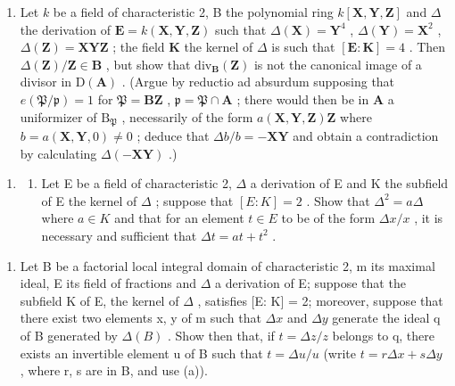 \begin{enumerate}
\item
  Let \(k\) be a field of characteristic 2, B the polynomial ring \(k[\mathbf{X}, \mathbf{Y}, \mathbf{Z}]\) and \(\Delta\) the derivation of \(\mathbf{E} = k(\mathbf{X}, \mathbf{Y}, \mathbf{Z})\) such that \(\Delta(\mathbf{X}) = \mathbf{Y}^4\) , \(\Delta(\mathbf{Y}) = \mathbf{X}^2\) , \(\Delta(\mathbf{Z}) = \mathbf{XYZ}\) ; the field \(\mathbf{K}\) the kernel of \(\Delta\) is such that \([\mathbf{E} : \mathbf{K}] = 4\) . Then \(\Delta(\mathbf{Z}) / \mathbf{Z} \in \mathbf{B}\) , but show that \(\mathrm{div}_{\mathbf{B}}(\mathbf{Z})\) is not the canonical image of a divisor in \(\mathrm{D}(\mathbf{A})\) . (Argue by reductio ad absurdum supposing that \(e(\mathfrak{P} / \mathfrak{p}) = 1\) for \(\mathfrak{P} = \mathbf{B}\mathbf{Z}\) , \(\mathfrak{p} = \mathfrak{P} \cap \mathbf{A}\) ; there would then be in \(\mathbf{A}\) a uniformizer of \(\mathrm{B}_{\mathfrak{P}}\) , necessarily of the form \(a(\mathbf{X}, \mathbf{Y}, \mathbf{Z})\mathbf{Z}\) where \(b = a(\mathbf{X}, \mathbf{Y}, 0) \neq 0\) ; deduce that \(\Delta b / b = -\mathbf{X}\mathbf{Y}\) and obtain a contradiction by calculating \(\Delta(-\mathbf{X}\mathbf{Y})\) .)
\end{enumerate}

\begin{enumerate}
\def\labelenumi{\arabic{enumi}.}
\setcounter{enumi}{23}
\tightlist
\item
  \begin{enumerate}
  \def\labelenumii{(\alph{enumii})}
  \tightlist
  \item
    Let E be a field of characteristic 2, \(\Delta\) a derivation of E and K the subfield of E the kernel of \(\Delta\) ; suppose that \([E:K]=2\) . Show that \(\Delta^{2}=a\Delta\) where \(a\in K\) and that for an element \(t\in E\) to be of the form \(\Delta x/x\) , it is necessary and sufficient that \(\Delta t=at+t^{2}\) .
  \end{enumerate}
\end{enumerate}

\begin{enumerate}
\def\labelenumi{(\alph{enumi})}
\setcounter{enumi}{1}
\tightlist
\item
  Let B be a factorial local integral domain of characteristic 2, m its maximal ideal, E its field of fractions and \(\Delta\) a derivation of E; suppose that the subfield K of E, the kernel of \(\Delta\) , satisfies {[}E: K{]} = 2; moreover, suppose that there exist two elements x, y of m such that \(\Delta x\) and \(\Delta y\) generate the ideal q of B generated by \(\Delta(B)\) . Show then that, if \(t = \Delta z / z\) belongs to q, there exists an invertible element u of B such that \(t = \Delta u / u\) (write \(t = r \Delta x + s \Delta y\) , where r, s are in B, and use (a)).
\end{enumerate}

